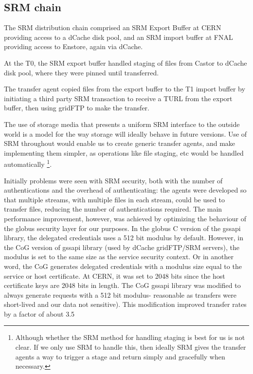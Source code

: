 \documentclass{cmspaper}
\begin{document}
\subsection{SRM chain}
The SRM distribution chain comprised an SRM Export Buffer at CERN
providing access to a dCache disk pool, and an SRM import buffer at
FNAL providing access to Enstore, again via dCache.

At the T0, the SRM export buffer handled staging of files from Castor
to dCache disk pool, where they were pinned until transferred.

The transfer agent copied files from the export buffer to the T1
import buffer by initiating a third party SRM transaction to receive a
TURL from the export buffer, then using gridFTP to make the transfer.

The use of storage media that presents a uniform SRM interface to the
outside world is a model for the way storage will ideally behave in
future versions. Use of SRM throughout would enable us to create
generic transfer agents, and make implementing them simpler, as
operations like file staging, etc would be handled automatically
\footnote{Although whether the SRM method for handling staging is best
for us is not clear. If we only use SRM to handle this, then ideally
SRM gives the transfer agents a way to trigger a stage and return
simply and gracefully when necessary.}.

Initially problems were seen with SRM security, both with the number
of authentications and the overhead of authenticating: the agents were
developed so that multiple streams, with multiple files in each
stream, could be used to transfer files, reducing the number of
authentications required. The main performance improvement, however,
was achieved by optimizing the behaviour of the globus security layer
for our purposes. In the globus C version of the gssapi library, the
delegated credentials uses a 512 bit modulus by default. However, in
the CoG version of gssapi library (used by dCache gridFTP/SRM
servers), the modulus is set to the same size as the service security
context. Or in another word, the CoG generates delegated credentials
with a modulus size equal to the service or host certificate.  At
CERN, it was set to 2048 bits since the host certificate keys are 2048
bits in length. The CoG gssapi library was modified to always generate
requests with a 512 bit modulus- reasonable as transfers were
short-lived and our data not sensitive). This modification improved transfer
rates by a factor of about 3.5
\end{document}
